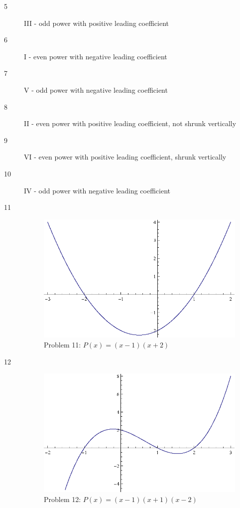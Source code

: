 \documentclass{exam}
\begin{document}
  \begin{description}

    \item[5] III - odd power with positive leading coefficient

    \item[6] I - even power with negative leading coefficient

    \item[7] V - odd power with negative leading coefficient
      
    \item[8] II - even power with positive leading coefficient, not shrunk vertically
      
    \item[9] VI - even power with positive leading coefficient, shrunk vertically

    \item[10] IV - odd power with negative leading coefficient

    \item[11]
      \begin{figure}[H]
        \centering
        \includegraphics[scale=0.9]{problem11.eps}
        \caption*{Problem 11: $P(x) = (x - 1)(x + 2)$}
      \end{figure}

    \item[12]
      \begin{figure}[H]
        \centering
        \includegraphics[scale=0.9]{problem12.eps}
        \caption*{Problem 12: $P(x) = (x - 1)(x + 1)(x - 2)$}
      \end{figure}


\end{description}
\end{document}
